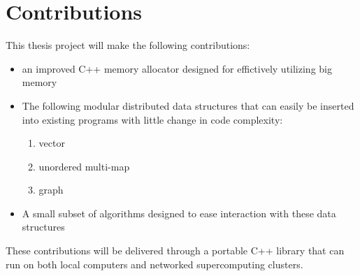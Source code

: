 \section{Contributions}
This thesis project will make the following contributions:
    \begin{itemize}
        \item an improved C++ memory allocator designed for effictively utilizing big memory
        \item The following modular distributed data structures that can easily be inserted into existing programs with little change in code complexity:
			\begin{enumerate}
                \item vector
                \item unordered multi-map
                \item graph
            \end{enumerate}
        \item A small subset of algorithms designed to ease interaction with these data structures 
    \end{itemize}
These contributions will be delivered through a portable C++ library that can run on both local computers and networked supercomputing clusters. 

